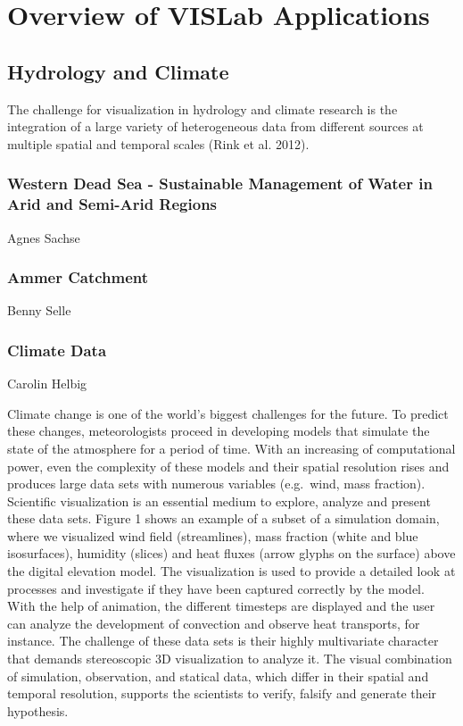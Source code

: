 \section{Overview of VISLab Applications}
\label{overview-of-vislab-applications}

\subsection{Hydrology and Climate}
\label{hydrology-and-climate}

The challenge for visualization in hydrology and climate research is the
integration of a large variety of heterogeneous data from different
sources at multiple spatial and temporal scales (Rink et al. 2012).

\subsubsection{Western Dead Sea - Sustainable Management of Water in Arid and Semi-Arid
Regions}
\label{western-dead-sea---sustainable-management-of-water-in-arid-and-semi-arid-regions}

Agnes Sachse \cite{graebe:modelcare}

\subsubsection{Ammer Catchment}
\label{ammer-catchment}

Benny Selle

\subsubsection{Climate Data}
\label{climate-data}

Carolin Helbig

Climate change is one of the world's biggest challenges for the future.
To predict these changes, meteorologists proceed in developing models
that simulate the state of the atmosphere for a period of time. With an
increasing of computational power, even the complexity of these models and
their spatial resolution rises and produces large data sets with numerous
variables (e.g.~wind, mass fraction). Scientific visualization is an
essential medium to explore, analyze and present these data sets. Figure
1 shows an example of a subset of a simulation domain, where we
visualized wind field (streamlines), mass fraction (white and blue
isosurfaces), humidity (slices) and heat fluxes (arrow glyphs on the
surface) above the digital elevation model. The visualization is used to
provide a detailed look at processes and investigate if they have been
captured correctly by the model. With the help of animation, the
different timesteps are displayed and the user can analyze the
development of convection and observe heat transports, for instance. The
challenge of these data sets is their highly multivariate character that
demands stereoscopic 3D visualization to analyze it. The visual
combination of simulation, observation, and statical data, which differ
in their spatial and temporal resolution, supports the scientists to
verify, falsify and generate their hypothesis.\cite{helbig:eesenvirvis}


